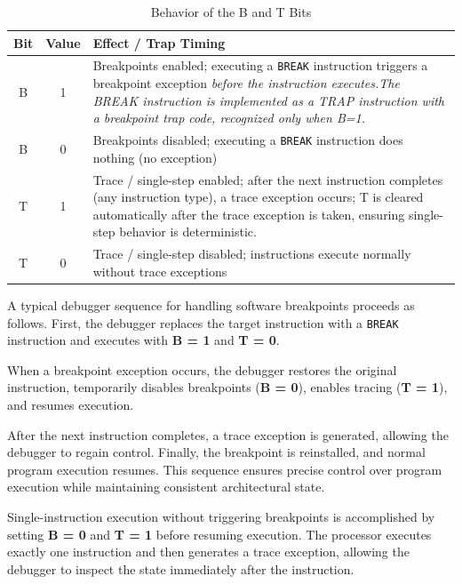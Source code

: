 \begin{table}[H]
\centering
\begin{tabularx}{\linewidth}{|c|c|X|}
\hline
\textbf{Bit} & \textbf{Value} & \textbf{Effect / Trap Timing} \\
\hline
B & 1 & Breakpoints enabled; executing a \texttt{BREAK} instruction triggers a breakpoint exception \emph{before the instruction executes.The BREAK instruction is implemented as a TRAP instruction with a breakpoint trap code, recognized only when B=1.} \\
B & 0 & Breakpoints disabled; executing a \texttt{BREAK} instruction does nothing (no exception) \\
T & 1 & Trace / single-step enabled; after the next instruction completes (any instruction type), a trace exception occurs; T is cleared automatically after the trace exception is taken, ensuring single-step behavior is deterministic. \\
T & 0 & Trace / single-step disabled; instructions execute normally without trace exceptions \\
\hline
\end{tabularx}
\caption{Behavior of the B and T Bits}
\end{table}


A typical debugger sequence for handling software breakpoints proceeds as follows. First, the debugger replaces the target instruction with a \texttt{BREAK} instruction and executes with \textbf{B = 1} and \textbf{T = 0}. 

When a breakpoint exception occurs, the debugger restores the original instruction, temporarily disables breakpoints (\textbf{B = 0}), enables tracing (\textbf{T = 1}), and resumes execution. 

After the next instruction completes, a trace exception is generated, allowing the debugger to regain control. Finally, the breakpoint is reinstalled, and normal program execution resumes. This sequence ensures precise control over program execution while maintaining consistent architectural state.


Single-instruction execution without triggering breakpoints is accomplished by setting \textbf{B = 0} and \textbf{T = 1} before resuming execution. The processor executes exactly one instruction and then generates a trace exception, allowing the debugger to inspect the state immediately after the instruction.


